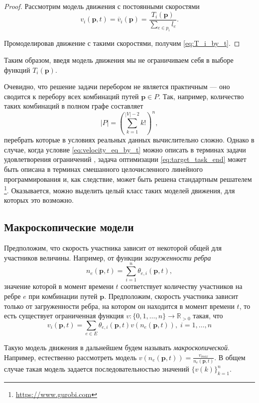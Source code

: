 \documentclass[12pt, a4paper]{article}
\begin{document}
\begin{proof}
Рассмотрим модель движения с постоянными скоростями  
$$v_i(\textbf{p}, t) = \overline{v}_i(\textbf{p}) = \frac{T_i (\textbf{p})}{\sum \limits_{e \in p_i} l_e}.$$

Промоделировав движение с такими скоростями, получим \eqref{eq:T_i_by_t}.
\end{proof}

Таким образом, введя модель движения мы не ограничиваем себя в выборе функций $T_i (\textbf{p})$.

Очевидно, что решение задачи перебором не является практичным --- оно сводится к перебору всех комбинаций путей $\textbf{p} \in P$. Так, например, количество таких комбинаций в полном графе составляет $$|P| = \left(\sum\limits_{k = 1}^{|V| - 2} k!\right)^n,$$ перебрать которые в условиях реальных данных вычислительно сложно.
Однако в случае, когда условие \eqref{eq:velocity_eq_by_t} можно описать в терминах задачи удовлетворения ограничений \cite{UO}, задача оптимизации \eqref{eq:target_task_end} может быть описана в терминах смешанного целочисленного линейного программирования и, как следствие, может быть решена стандартным решателем \footnote{\url{https://www.gurobi.com}}. Оказывается, можно выделить целый класс таких моделей движения, для которых это возможно.

\subsection{Макроскопические модели}

Предположим, что скорость участника зависит от некоторой общей для участников величины. Например, от функции \textit{загруженности ребра}
$$ n_{e}(\textbf{p}, t) = \sum\limits_{i = 1}^n\theta_{e, i}(\textbf{p}, t),$$
значение которой в момент времени $t$ соответствует количеству участников на ребре $e$ при комбинации путей $\textbf{p}$. Предположим, скорость участника зависит только от загруженности ребра, на котором он находится в момент времени $t$, то есть существует ограниченная функция $v : \{0, 1, \dots, n\} \rightarrow \mathbb{R}_{> 0}$ такая, что
\begin{equation}
	\label{eq:velocity_eq_macro}
	 v_i(\textbf{p}, t) = \sum \limits _{e \in E} \theta_{e, i} (\textbf{p}, t) v (n_e (\textbf{p}, t)), \; i = 1, \dots, n
\end{equation}

Такую модель движения в дальнейшем будем называть \textit{макроскопической}.
Например, естественно рассмотреть модель $ v (n_e (\textbf{p}, t)) = \frac{v_{max}}{n_e (\textbf{p}, t)}$. В общем случае такая модель задается последовательностью значений  $\{v(k)\}_{k = 1}^n$.
\end{document}
